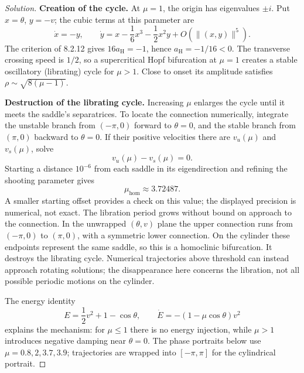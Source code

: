 \documentclass[10pt]{amsart}
\newenvironment{solution}
{\begin{proof}[Solution]}
{\end{proof}}
\begin{document}
\begin{onehalfspace}
\begin{solution}
\textbf{Creation of the cycle.} At $\mu=1$, the origin has eigenvalues $\pm i$. Put $x=\theta$, $y=-v$; the cubic terms at this parameter are
\[
 \dot x=-y,\qquad
 \dot y=x-\frac16x^3-\frac12x^2y+O(\|(x,y)\|^5).
\]
The criterion of 8.2.12 gives $16a_{\mathrm H}=-1$, hence $a_{\mathrm H}=-1/16<0$. The transverse crossing speed is $1/2$, so a supercritical Hopf bifurcation at $\mu=1$ creates a stable oscillatory (librating) cycle for $\mu>1$. Close to onset its amplitude satisfies $\rho\sim\sqrt{8(\mu-1)}$.

\textbf{Destruction of the librating cycle.} Increasing $\mu$ enlarges the cycle until it meets the saddle's separatrices. To locate the connection numerically, integrate the unstable branch from $(-\pi,0)$ forward to $\theta=0$, and the stable branch from $(\pi,0)$ backward to $\theta=0$. If their positive velocities there are $v_u(\mu)$ and $v_s(\mu)$, solve
\[
 v_u(\mu)-v_s(\mu)=0.
\]
Starting a distance $10^{-6}$ from each saddle in its eigendirection and refining the shooting parameter gives
\[
 \mu_{\mathrm{hom}}\approx3.72487.
\]
A smaller starting offset provides a check on this value; the displayed precision is numerical, not exact. The libration period grows without bound on approach to the connection. In the unwrapped $(\theta,v)$ plane the upper connection runs from $(-\pi,0)$ to $(\pi,0)$, with a symmetric lower connection. On the cylinder these endpoints represent the same saddle, so this is a homoclinic bifurcation. It destroys the librating cycle. Numerical trajectories above threshold can instead approach rotating solutions; the disappearance here concerns the libration, not all possible periodic motions on the cylinder.

The energy identity
\[
 E=\frac12v^2+1-\cos\theta,\qquad
 \dot E=-(1-\mu\cos\theta)v^2
\]
explains the mechanism: for $\mu\leq1$ there is no energy injection, while $\mu>1$ introduces negative damping near $\theta=0$. The phase portraits below use $\mu=0.8,2,3.7,3.9$; trajectories are wrapped into $[-\pi,\pi]$ for the cylindrical portrait.


\end{solution}
\end{onehalfspace}
\end{document}
